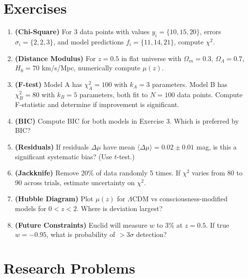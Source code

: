 \section*{Exercises}

\begin{enumerate}
\item \textbf{(Chi-Square)} For 3 data points with values $y_i = \{10, 15, 20\}$, errors $\sigma_i = \{2, 2, 3\}$, and model predictions $f_i = \{11, 14, 21\}$, compute $\chi^2$.

\item \textbf{(Distance Modulus)} For $z = 0.5$ in flat universe with $\Omega_m = 0.3$, $\Omega_\Lambda = 0.7$, $H_0 = 70$ km/s/Mpc, numerically compute $\mu(z)$.

\item \textbf{(F-test)} Model A has $\chi^2_A = 100$ with $k_A = 3$ parameters. Model B has $\chi^2_B = 80$ with $k_B = 5$ parameters, both fit to $N = 100$ data points. Compute F-statistic and determine if improvement is significant.

\item \textbf{(BIC)} Compute BIC for both models in Exercise 3. Which is preferred by BIC?

\item \textbf{(Residuals)} If residuals $\Delta \mu$ have mean $\langle \Delta \mu \rangle = 0.02 \pm 0.01$ mag, is this a significant systematic bias? (Use $t$-test.)

\item \textbf{(Jackknife)} Remove 20\% of data randomly 5 times. If $\chi^2$ varies from 80 to 90 across trials, estimate uncertainty on $\chi^2$.

\item \textbf{(Hubble Diagram)} Plot $\mu(z)$ for $\Lambda$CDM vs consciousness-modified models for $0 < z < 2$. Where is deviation largest?

\item \textbf{(Future Constraints)} Euclid will measure $w$ to 3\% at $z = 0.5$. If true $w = -0.95$, what is probability of $> 3\sigma$ detection?
\end{enumerate}

\section*{Research Problems}

